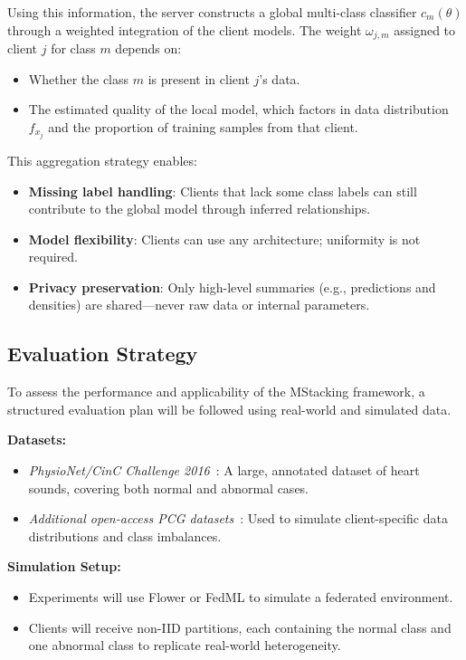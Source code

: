 Using this information, the server constructs a global multi-class classifier $c_m(\theta)$ through a weighted integration of the client models. The weight $\omega_{j,m}$ assigned to client $j$ for class $m$ depends on:
\begin{itemize}
    \item Whether the class $m$ is present in client $j$’s data.
    \item The estimated quality of the local model, which factors in data distribution $f_{x_j}$ and the proportion of training samples from that client.
\end{itemize}

This aggregation strategy enables:
\begin{itemize}
    \item \textbf{Missing label handling}: Clients that lack some class labels can still contribute to the global model through inferred relationships.
    \item \textbf{Model flexibility}: Clients can use any architecture; uniformity is not required.
    \item \textbf{Privacy preservation}: Only high-level summaries (e.g., predictions and densities) are shared—never raw data or internal parameters.
\end{itemize}

\subsection{Evaluation Strategy}
\label{sec:evaluation_strategy}

To assess the performance and applicability of the MStacking framework, a structured evaluation plan will be followed using real-world and simulated data.

\textbf{Datasets:}
\begin{itemize}
    \item \textit{PhysioNet/CinC Challenge 2016}~\cite{clifford2016classification}: A large, annotated dataset of heart sounds, covering both normal and abnormal cases.
    \item \textit{Additional open-access PCG datasets}~\cite{liu2016open}: Used to simulate client-specific data distributions and class imbalances.
\end{itemize}

\textbf{Simulation Setup:}
\begin{itemize}
    \item Experiments will use Flower or FedML to simulate a federated environment.
    \item Clients will receive non-IID partitions, each containing the normal class and one abnormal class to replicate real-world heterogeneity.
\end{itemize}

